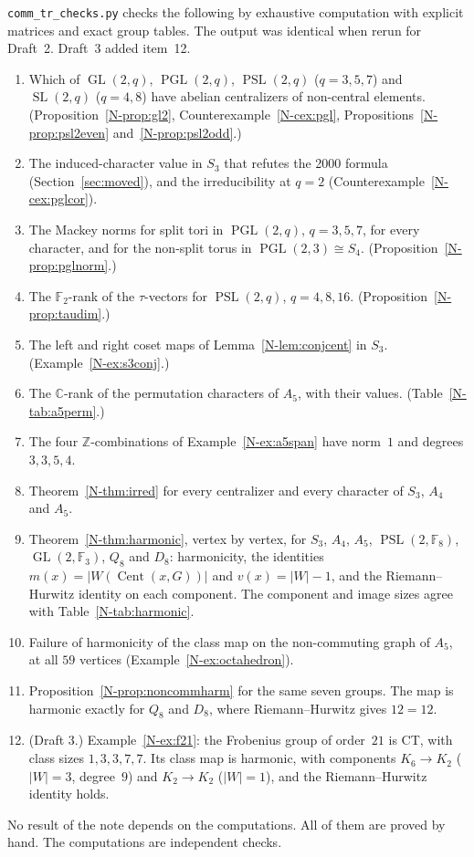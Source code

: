 \documentclass[12pt,letterpaper]{article}
\newcommand{\F}{\mathbb{F}}
\newcommand{\C}{\mathbb{C}}
\newcommand{\Z}{\mathbb{Z}}
\DeclareMathOperator{\PGL}{PGL}
\DeclareMathOperator{\PSL}{PSL}
\DeclareMathOperator{\GL}{GL}
\DeclareMathOperator{\SL}{SL}
\DeclareMathOperator{\Cent}{Cent}
\begin{document}
\texttt{comm\_tr\_checks.py} checks the following by exhaustive computation
with explicit matrices and exact group tables. The output was identical when
rerun for Draft~2. Draft~3 added item~12.
\begin{enumerate}[itemsep=1pt]
\item Which of $\GL(2,q)$, $\PGL(2,q)$, $\PSL(2,q)$ ($q=3,5,7$) and
  $\SL(2,q)$ ($q=4,8$) have abelian centralizers of non-central elements.
  (Proposition~\ref{N-prop:gl2}, Counterexample~\ref{N-cex:pgl},
  Propositions~\ref{N-prop:psl2even} and~\ref{N-prop:psl2odd}.)
\item The induced-character value in $S_3$ that refutes the 2000 formula
  (Section~\ref{sec:moved}), and the irreducibility at $q=2$
  (Counterexample~\ref{N-cex:pglcor}).
\item The Mackey norms for split tori in $\PGL(2,q)$, $q=3,5,7$, for every
  character, and for the non-split torus in $\PGL(2,3)\cong S_4$.
  (Proposition~\ref{N-prop:pglnorm}.)
\item The $\F_2$-rank of the $\tau$-vectors for $\PSL(2,q)$, $q=4,8,16$.
  (Proposition~\ref{N-prop:taudim}.)
\item The left and right coset maps of Lemma~\ref{N-lem:conjcent} in $S_3$.
  (Example~\ref{N-ex:s3conj}.)
\item The $\C$-rank of the permutation characters of $A_5$, with their
  values. (Table~\ref{N-tab:a5perm}.)
\item The four $\Z$-combinations of Example~\ref{N-ex:a5span} have norm~$1$
  and degrees $3,3,5,4$.
\item Theorem~\ref{N-thm:irred} for every centralizer and every character
  of $S_3$, $A_4$ and $A_5$.
\item Theorem~\ref{N-thm:harmonic}, vertex by vertex, for $S_3$, $A_4$,
  $A_5$, $\PSL(2,\F_8)$, $\GL(2,\F_3)$, $Q_8$ and $D_8$: harmonicity, the
  identities $m(x)=|W(\Cent(x,G))|$ and $v(x)=|W|-1$, and the
  Riemann--Hurwitz identity on each component. The component and image
  sizes agree with Table~\ref{N-tab:harmonic}.
\item Failure of harmonicity of the class map on the non-commuting graph of
  $A_5$, at all $59$ vertices (Example~\ref{N-ex:octahedron}).
\item Proposition~\ref{N-prop:noncommharm} for the same seven groups. The
  map is harmonic exactly for $Q_8$ and $D_8$, where Riemann--Hurwitz gives
  $12=12$.
\item (Draft 3.) Example~\ref{N-ex:f21}: the Frobenius group of order~$21$
  is CT, with class sizes $1,3,3,7,7$. Its class map is harmonic, with
  components $K_6\to K_2$ ($|W|=3$, degree~$9$) and $K_2\to K_2$ ($|W|=1$),
  and the Riemann--Hurwitz identity holds.
\end{enumerate}
No result of the note depends on the computations. All of them are proved by
hand. The computations are independent checks.
\end{document}
